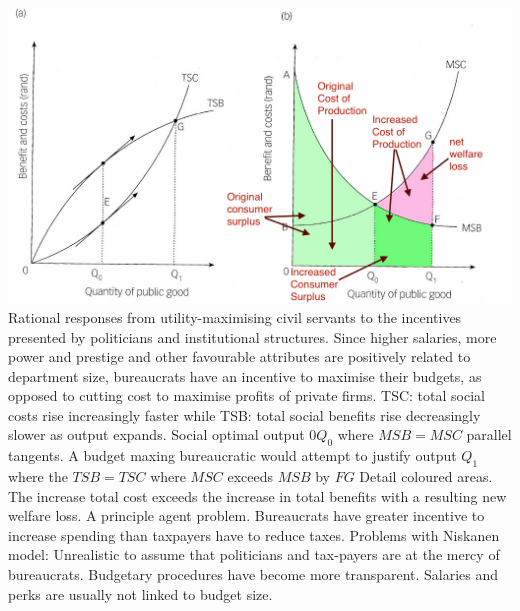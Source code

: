 \documentclass[12pt]{examnotes}
\begin{document}
\includegraphics[scale=0.35]{./imgs/62.jpg}
\ra Rational responses from utility-maximising civil servants to the incentives presented by politicians and institutional structures.
\ra Since higher salaries, more power and prestige and other favourable attributes are positively related to department size, bureaucrats have an incentive to maximise their budgets, as opposed to cutting cost to maximise profits of private firms.
\ra TSC: total social costs rise increasingly faster while TSB: total social benefits rise decreasingly slower as output expands.
\ra Social optimal output $0Q_0$ where $MSB=MSC$ parallel tangents. 
\ra A budget maxing bureaucratic would attempt to justify output $Q_1$ where the $TSB=TSC$ where $MSC$ exceeds $MSB$ by $FG$
\ra Detail coloured areas.
\ra The increase total cost exceeds the increase in total benefits with a resulting new welfare loss.
\ra A principle agent problem. Bureaucrats have greater incentive to increase spending than taxpayers have to reduce taxes.
\ra Problems with Niskanen model:
 Unrealistic to assume that politicians and tax-payers are at the mercy of bureaucrats.
 Budgetary procedures have become more transparent.
 Salaries and perks are usually not linked to budget size.
\end{document}
